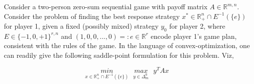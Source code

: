 \documentclass[a4paper,10pt,journal]{IEEEtran}
\newcommand{\dive}{\textrm{div} }
\begin{document}

Consider a two-person zero-sum sequential game with payoff matrix $A \in \mathbb{R}^{m,n}$. Consider the problem of
finding the best response strategy $x^* \in \mathbb{R}_{+}^n \cap E^{-1}(\{e\})$ for player 1, given a fixed
(possibly mixed) strategy $y_0$ for player 2, where $E \in \{-1, 0, +1\}^{r,n}$ and $(1, 0, 0, ..., 0) =: e \in \mathbb{R}^r$ encode player
1's game plan, consistent with the rules of the game. In the language of convex-optimization, one can readily give the following saddle-point formulation for this problem. Viz,

\begin{equation}
  \underset{x \in \mathbb{R}_{+}^n \cap E^{-1}(\{e\})}{min}\text{ }\underset{y \in \Delta_{m}^0}{max}\text{ }y^TAx
\end{equation}
\end{document}
